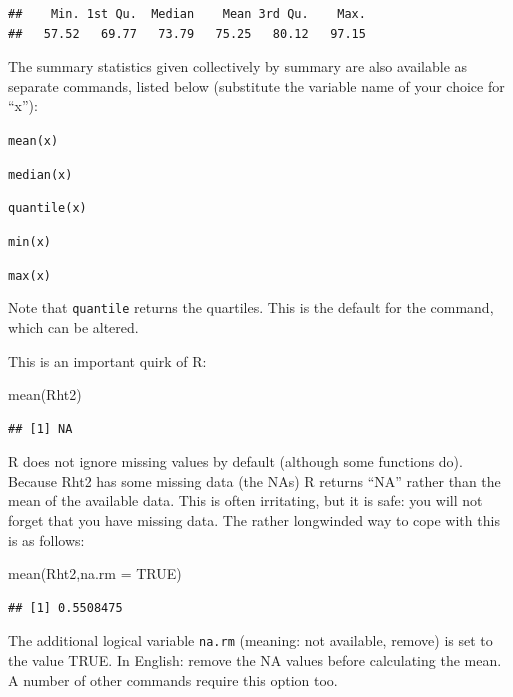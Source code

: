 \documentclass[
]{book}
\newenvironment{Shaded}{\begin{snugshade}}{\end{snugshade}}
\newcommand{\AttributeTok}[1]{\textcolor[rgb]{0.77,0.63,0.00}{#1}}
\newcommand{\ConstantTok}[1]{\textcolor[rgb]{0.00,0.00,0.00}{#1}}
\newcommand{\FunctionTok}[1]{\textcolor[rgb]{0.00,0.00,0.00}{#1}}
\newcommand{\NormalTok}[1]{#1}
\begin{document}
\begin{verbatim}
##    Min. 1st Qu.  Median    Mean 3rd Qu.    Max. 
##   57.52   69.77   73.79   75.25   80.12   97.15
\end{verbatim}

The summary statistics given collectively by summary are also available as separate commands, listed below (substitute the variable name of your choice for ``x''):

\texttt{mean(x)}

\texttt{median(x)}

\texttt{quantile(x)}

\texttt{min(x)}

\texttt{max(x)}

Note that \texttt{quantile} returns the quartiles. This is the default for the command, which can be altered.

This is an important quirk of R:

\begin{Shaded}
\begin{Highlighting}[]
\FunctionTok{mean}\NormalTok{(Rht2)}
\end{Highlighting}
\end{Shaded}

\begin{verbatim}
## [1] NA
\end{verbatim}

R does not ignore missing values by default (although some functions do). Because Rht2 has some missing data (the NAs) R returns ``NA'' rather than the mean of the available data. This is often irritating, but it is safe: you will not forget that you have missing data. The rather longwinded way to cope with this is as follows:

\begin{Shaded}
\begin{Highlighting}[]
\FunctionTok{mean}\NormalTok{(Rht2,}\AttributeTok{na.rm =} \ConstantTok{TRUE}\NormalTok{)}
\end{Highlighting}
\end{Shaded}

\begin{verbatim}
## [1] 0.5508475
\end{verbatim}

The additional logical variable \texttt{na.rm} (meaning: not available, remove) is set to the value TRUE. In English: remove the NA values before calculating the mean. A number of other commands require this option too.
\end{document}
